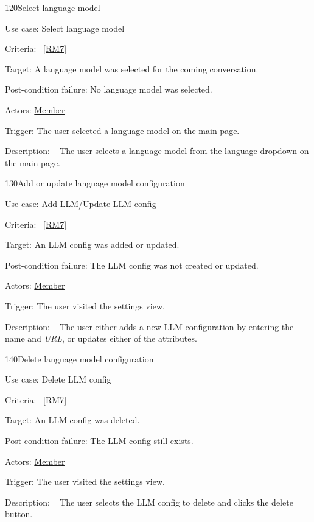 \begin{function}{120}{Select language model}
	\item[Use case:] Select language model
	\item[Criteria:]~\ref{RM7}
	\item[Target:] A language model was selected for the coming conversation.
	\item[Post-condition failure:] No language model was selected.
	\item[Actors:] \hyperref[def:member]{Member}
	\item[Trigger:] The user selected a language model on the main page.
	\item[Description:] ~
	The user selects a language model from the language dropdown on the main page.
\end{function}

\begin{function}{130}{Add or update language model configuration}
	\item[Use case:] Add LLM/Update LLM config
	\item[Criteria:]~\ref{RM7}
	\item[Target:] An LLM config was added or updated.
	\item[Post-condition failure:] The LLM config was not created or updated.
	\item[Actors:] \hyperref[def:member]{Member}
	\item[Trigger:] The user visited the settings view.
	\item[Description:] ~
	The user either adds a new LLM configuration by entering the name and \textit{URL}, or updates either of the attributes.
\end{function}

\vspace{2.0em}

\begin{function}{140}{Delete language model configuration}
	\item[Use case:] Delete LLM config
	\item[Criteria:]~\ref{RM7}
	\item[Target:] An LLM config was deleted.
	\item[Post-condition failure:] The LLM config still exists.
	\item[Actors:] \hyperref[def:member]{Member}
	\item[Trigger:] The user visited the settings view.
	\item[Description:] ~
	The user selects the LLM config to delete and clicks the delete button.
\end{function}

